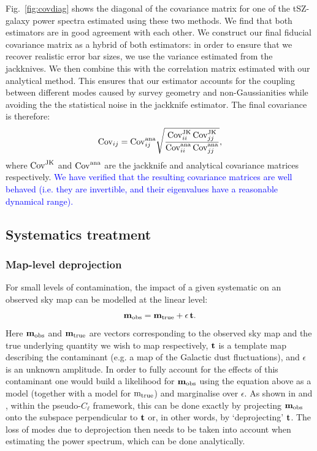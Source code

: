 \documentclass[useAMS,usenatbib]{mn2e}
\newcommand{\DA}[1]{\textcolor{blue}{#1}}
\begin{document}
    Fig.\!~\ref{fig:covdiag} shows the diagonal of the covariance matrix for one of the tSZ-galaxy power spectra estimated using these two methods. We find that both estimators are in good agreement with each other. We construct our final fiducial covariance matrix as a hybrid of both estimators: in order to ensure that we recover realistic error bar sizes, we use the variance estimated from the jackknives. We then combine this with the correlation matrix estimated with our analytical method. This ensures that our estimator accounts for the coupling between different modes caused by survey geometry and non-Gaussianities while avoiding the the statistical noise in the jackknife estimator. The final covariance is therefore:
    \begin{equation}
      {\rm Cov}_{ij} = {\rm Cov}^{\rm ana}_{ij} \sqrt{\frac{{\rm Cov}^{\rm JK}_{ii}\,{\rm Cov}^{\rm JK}_{jj}}{{\rm Cov}^{\rm ana}_{ii}\,{\rm Cov}^{\rm ana}_{jj}}},
    \end{equation}
    where ${\rm Cov}^{\rm JK}$ and ${\rm Cov}^{\rm ana}$ are the jackknife and analytical covariance matrices respectively. \DA{We have verified that the resulting covariance matrices are well behaved (i.e. they are invertible, and their eigenvalues have a reasonable dynamical range).}

  \subsection{Systematics treatment}\label{ssec:methods.syst}
    \subsubsection{Map-level deprojection}\label{sssec:methods.syst.deproj}
      For small levels of contamination, the impact of a given systematic on an observed sky map can be modelled at the linear level:
      \begin{equation}
        {\bf m}_{\rm obs}={\bf m}_{\rm true} + \epsilon\,{\bf t}.
      \end{equation}
      Here ${\bf m}_{\rm obs}$ and ${\bf m}_{\rm true}$ are vectors corresponding to the observed sky map and the true underlying quantity we wish to map respectively, ${\bf t}$ is a template map describing the contaminant (e.g. a map of the Galactic dust fluctuations), and $\epsilon$ is an unknown amplitude. In order to fully account for the effects of this contaminant one would build a likelihood for ${\bf m}_{\rm obs}$ using the equation above as a model (together with a model for ${\rm m}_{\rm true}$) and marginalise over $\epsilon$. As shown in \cite{2017MNRAS.465.1847E} and \cite{2019MNRAS.484.4127A}, within the pseudo-$C_\ell$ framework, this can be done exactly by projecting ${\bf m}_{\rm obs}$ onto the subspace perpendicular to ${\bf t}$ or, in other words, by `deprojecting' ${\bf t}$. The loss of modes due to deprojection then needs to be taken into account when estimating the power spectrum, which can be done analytically.
\end{document}
